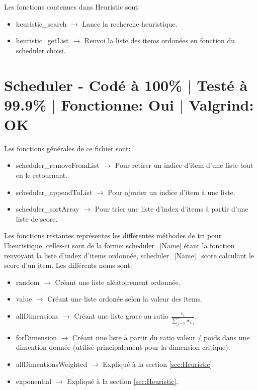 \documentclass{EPUProjetPeiP}
\newcommand{\comp}[5]{
	\section[#1]{#1 {\small - Codé à #2\% $\vert$ Testé à #3\% $\vert$ Fonctionne: #4 $\vert$ Valgrind: #5}}
}
\begin{document}
Les fonctions contenues dans Heuristic sont:
\begin{itemize}
	\item heuristic\_search $\longrightarrow$ Lance la recherche heuristique.
	\item heuristic\_getList $\longrightarrow$ Renvoi la liste des items ordonées en fonction du scheduler choisi.
\end{itemize}

\comp{Scheduler \label{sec:Scheduler}}{100}{99.9}{Oui}{OK}
Les fonctions générales de ce fichier sont:
\begin{itemize}
	\item scheduler\_removeFromList $\longrightarrow$ Pour retirer un indice d'item d'une liste tout en le retournant.
	\item scheduler\_appendToList $\longrightarrow$ Pour ajouter un indice d'item à une liste.
	\item scheduler\_sortArray $\longrightarrow$ Pour trier une liste d'index d'items à partir d'une liste de score.\\
\end{itemize}

Les fonctions restantes représentes les différentes méthodes de tri pour l'heuristique, celles-ci sont de la forme: scheduler\_[Name] étant la fonction renvoyant la liste d'index d'items ordonnée, scheduler\_[Name]\_score calculant le score d'un item.
Les différents noms sont:
\begin{itemize}
	\item random $\longrightarrow$ Créant une liste aléatoirement ordonnée.
	\item value $\longrightarrow$ Créant une liste ordonée selon la valeur des items.
	\item allDimensions $\longrightarrow$ Créant une liste grace au ratio $\frac{v_i}{\sum_{j=0}^mw_{i,j}}$.
	\item forDimension $\longrightarrow$ Créant une liste à partir du ratio valeur / poids dans une dimention donnée (utilisé principalement pour la dimension critique).
	\item allDimentionsWeighted  $\longrightarrow$ Expliqué à la section \ref{sec:Heuristic}.
	\item exponential  $\longrightarrow$ Expliqué à la section \ref{sec:Heuristic}.
\end{itemize}
\end{document}
